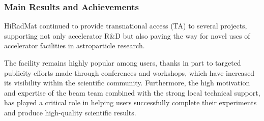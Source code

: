 
\subsubsection*{Main Results and Achievements}

HiRadMat continued to provide transnational access (TA) to several projects, supporting not only accelerator R\&D but also paving the way for novel uses of accelerator facilities in astroparticle research. 

The facility remains highly popular among users, thanks in part to targeted publicity efforts made through conferences and workshops, which have increased its visibility within the scientific community. Furthermore, the high motivation and expertise of the beam team combined with the strong local technical support, has played a critical role in helping users successfully complete their experiments and produce high-quality scientific results.


